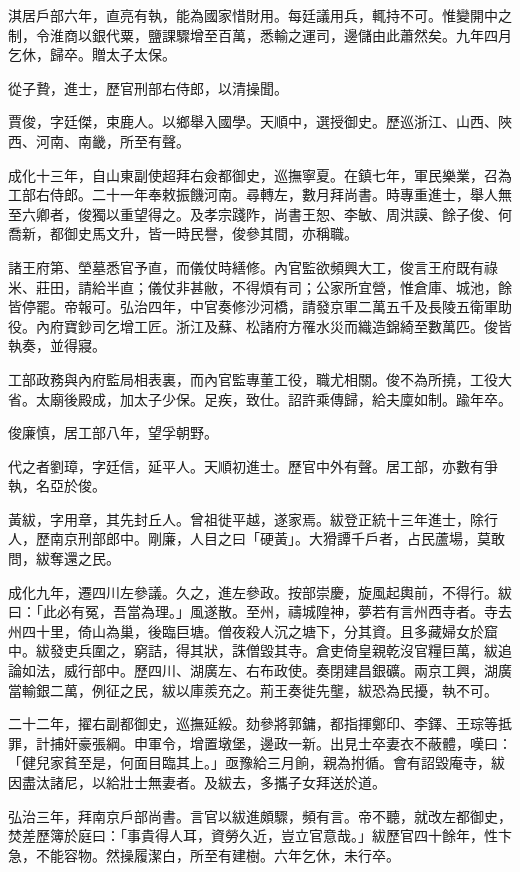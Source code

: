 \begin{pinyinscope}
淇居戶部六年，直亮有執，能為國家惜財用。每廷議用兵，輒持不可。惟變開中之制，令淮商以銀代粟，鹽課驟增至百萬，悉輸之運司，邊儲由此蕭然矣。九年四月乞休，歸卒。贈太子太保。

從子贄，進士，歷官刑部右侍郎，以清操聞。

賈俊，字廷傑，束鹿人。以鄉舉入國學。天順中，選授御史。歷巡浙江、山西、陜西、河南、南畿，所至有聲。

成化十三年，自山東副使超拜右僉都御史，巡撫寧夏。在鎮七年，軍民樂業，召為工部右侍郎。二十一年奉敕振饑河南。尋轉左，數月拜尚書。時專重進士，舉人無至六卿者，俊獨以重望得之。及孝宗踐阼，尚書王恕、李敏、周洪謨、餘子俊、何喬新，都御史馬文升，皆一時民譽，俊參其間，亦稱職。

諸王府第、塋墓悉官予直，而儀仗時繕修。內官監欲頻興大工，俊言王府既有祿米、莊田，請給半直；儀仗非甚敝，不得煩有司；公家所宜營，惟倉庫、城池，餘皆停罷。帝報可。弘治四年，中官奏修沙河橋，請發京軍二萬五千及長陵五衛軍助役。內府寶鈔司乞增工匠。浙江及蘇、松諸府方罹水災而織造錦綺至數萬匹。俊皆執奏，並得寢。

工部政務與內府監局相表裏，而內官監專董工役，職尤相關。俊不為所撓，工役大省。太廟後殿成，加太子少保。足疾，致仕。詔許乘傳歸，給夫廩如制。踰年卒。

俊廉慎，居工部八年，望孚朝野。

代之者劉璋，字廷信，延平人。天順初進士。歷官中外有聲。居工部，亦數有爭執，名亞於俊。

黃紱，字用章，其先封丘人。曾祖徙平越，遂家焉。紱登正統十三年進士，除行人，歷南京刑部郎中。剛廉，人目之曰「硬黃」。大猾譚千戶者，占民蘆場，莫敢問，紱奪還之民。

成化九年，遷四川左參議。久之，進左參政。按部崇慶，旋風起輿前，不得行。紱曰：「此必有冤，吾當為理。」風遂散。至州，禱城隍神，夢若有言州西寺者。寺去州四十里，倚山為巢，後臨巨塘。僧夜殺人沉之塘下，分其資。且多藏婦女於窟中。紱發吏兵圍之，窮詰，得其狀，誅僧毀其寺。倉吏倚皇親乾沒官糧巨萬，紱追論如法，威行部中。歷四川、湖廣左、右布政使。奏閉建昌銀礦。兩京工興，湖廣當輸銀二萬，例征之民，紱以庫羨充之。荊王奏徙先壟，紱恐為民擾，執不可。

二十二年，擢右副都御史，巡撫延綏。劾參將郭鏞，都指揮鄭印、李鐸、王琮等抵罪，計捕奸豪張綱。申軍令，增置墩堡，邊政一新。出見士卒妻衣不蔽體，嘆曰：「健兒家貧至是，何面目臨其上。」亟豫給三月餉，親為拊循。會有詔毀庵寺，紱因盡汰諸尼，以給壯士無妻者。及紱去，多攜子女拜送於道。

弘治三年，拜南京戶部尚書。言官以紱進頗驟，頻有言。帝不聽，就改左都御史，焚差歷簿於庭曰：「事貴得人耳，資勞久近，豈立官意哉。」紱歷官四十餘年，性卞急，不能容物。然操履潔白，所至有建樹。六年乞休，未行卒。


\end{pinyinscope}
